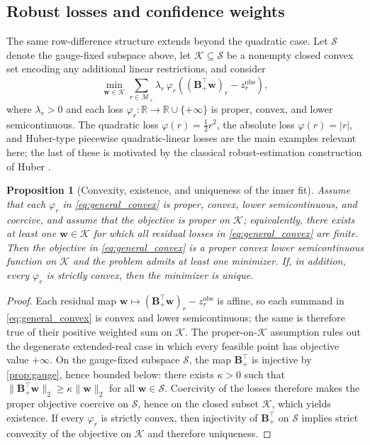 \documentclass[preprint,12pt]{elsarticle}
\newtheorem{proposition}{Proposition}
\newcommand{\R}{\mathbb{R}}
\newcommand{\weights}{\mathbf{w}}
\newcommand{\rowset}{\mathcal{M}}
\newcommand{\inc}{\mathbf{B}}
\begin{document}
\subsection{Robust losses and confidence weights}
The same row-difference structure extends beyond the quadratic case. Let $\mathcal{S}$ denote the
gauge-fixed subspace above, let $\mathcal{K}\subseteq\mathcal{S}$ be a nonempty
closed convex set encoding any additional linear restrictions, and consider
\begin{equation}
    \min_{\weights\in\mathcal{K}}
    \sum_{r\in\rowset_+}
    \lambda_r\,
    \varphi_r\!\left((\inc_+^\top\weights)_r-z_r^{\mathrm{obs}}\right),
    \label{eq:general_convex}
\end{equation}
where $\lambda_r>0$ and each loss $\varphi_r:\R\to\R\cup\{+\infty\}$ is
proper, convex, and lower semicontinuous. The quadratic loss
$\varphi(r)=\tfrac12 r^2$, the absolute loss $\varphi(r)=|r|$, and Huber-type
piecewise quadratic-linear losses are the main examples relevant here; the last
of these is motivated by the classical robust-estimation construction of Huber
\cite{Huber1964}.

\begin{proposition}[Convexity, existence, and uniqueness of the inner fit]
\label{prop:convex}
Assume that each $\varphi_r$ in \eqref{eq:general_convex} is proper, convex,
lower semicontinuous, and coercive, and assume that the objective is proper on
$\mathcal{K}$; equivalently, there exists at least one $\weights\in\mathcal{K}$
for which all residual losses in \eqref{eq:general_convex} are finite. Then the
objective in \eqref{eq:general_convex} is a proper convex lower semicontinuous
function on $\mathcal{K}$ and the problem admits at least one minimizer. If,
in addition, every $\varphi_r$ is strictly convex, then the minimizer is
unique.
\end{proposition}

\begin{proof}
Each residual map
$\weights\mapsto (\inc_+^\top\weights)_r-z_r^{\mathrm{obs}}$ is affine, so each
summand in \eqref{eq:general_convex} is convex and lower semicontinuous; the
same is therefore true of their positive weighted sum on $\mathcal{K}$. The
proper-on-$\mathcal{K}$ assumption rules out the degenerate extended-real case
in which every feasible point has objective value $+\infty$. On the gauge-fixed
subspace $\mathcal{S}$, the map $\inc_+^\top$ is injective by \cref{prop:gauge},
hence bounded below: there exists $\kappa>0$ such that
$\|\inc_+^\top\weights\|_2\ge \kappa\|\weights\|_2$ for all
$\weights\in\mathcal{S}$. Coercivity of the losses therefore makes the proper
objective coercive on $\mathcal{S}$, hence on the closed subset $\mathcal{K}$,
which yields existence. If every $\varphi_r$ is strictly convex, then
injectivity of $\inc_+^\top$ on $\mathcal{S}$ implies strict convexity of the
objective on $\mathcal{K}$ and therefore uniqueness.
\end{proof}
\end{document}
